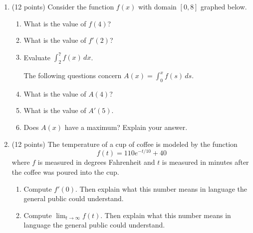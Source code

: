 \documentclass[12pt]{article}
\let\ds\displaystyle
\begin{document}
\begin{enumerate}
\newpage
\item (12 points) Consider the function $f(x)$ with domain $[0,8]$ graphed below. 

\begin{center}
\end{center}

\bigskip
	\begin{enumerate}
\item What is the value of $f(4)$?

\vfill

\item  What is the value of $f'(2)$?

\vfill

\item  Evaluate $\ds \int_{2}^{7} f(x)\,dx$.

\vfill
\hspace*{-0.5in} The following questions concern $A(x) =\ds \int_0^x f(s)\,ds$. \\


\item  What is the value of $A(4)$?

\vfill

\item  What is the value of $A'(5)$.

\vfill

\item Does $A(x)$  have a maximum? Explain your answer.
\vfill
	\end{enumerate}

\newpage


\item (12 points) The temperature of a cup of coffee is modeled by the function $$f(t)=110e^{-t/10}+40$$ where $f$ is measured in degrees Fahrenheit and $t$ is measured in minutes after the coffee was poured into the cup.\\
	\begin{enumerate}
\item Compute $f'(0).$ Then explain what this number means in language the general public could understand.
\vfill
\item Compute $\ds \lim_{t \to \infty} f(t)$. Then explain what this number means in language the general public could understand.
\vfill
	\end{enumerate}


\end{enumerate}
\end{document}
